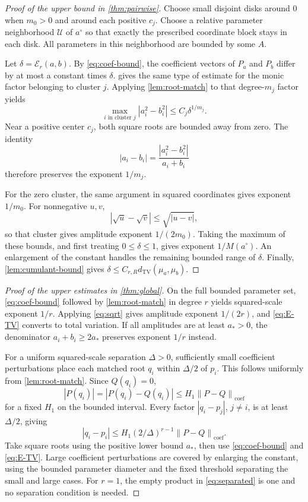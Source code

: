 \documentclass[11pt,a4paper]{article}
\numberwithin{equation}{section}
\theoremstyle{definition}
\theoremstyle{remark}
\newcommand{\TV}{d_{\mathrm{TV}}}
\newcommand{\norm}[1]{\left\lVert#1\right\rVert}
\newcommand{\coef}{\operatorname{coef}}
\newcommand{\err}{\mathcal E_r}
\newcommand{\base}{a^{\circ}}
\begin{document}
\begin{proof}[Proof of the upper bound in \cref{thm:pairwise}]
Choose small disjoint disks around $0$ when $m_0>0$ and around each positive
$c_j$.  Choose a relative parameter neighborhood $\mathcal U$ of $\base$ so that
exactly the prescribed coordinate block stays in each disk.  All parameters
in this neighborhood are bounded by some $A$.

Let $\delta=\err(a,b)$.  By \eqref{eq:coef-bound}, the coefficient vectors of
$P_a$ and $P_b$ differ by at most a constant times $\delta$.
 gives the same type of estimate for the monic factor belonging
to cluster $j$.  Applying \cref{lem:root-match} to that degree-$m_j$ factor yields
\begin{equation}
 \max_{i\text{ in cluster }j}|a_i^2-b_i^2|
 \le C_j\delta^{1/m_j}.
 \label{eq:squared-cluster}
\end{equation}
Near a positive center $c_j$, both square roots are bounded away from zero.
The identity
\[
 |a_i-b_i|=\frac{|a_i^2-b_i^2|}{a_i+b_i}
\]
therefore preserves the exponent $1/m_j$.

For the zero cluster, the same argument in squared coordinates gives exponent
$1/m_0$.  For nonnegative $u,v$,
\begin{equation}
 |\sqrt u-\sqrt v|\le\sqrt{|u-v|},
 \label{eq:sqrt}
\end{equation}
so that cluster gives amplitude exponent $1/(2m_0)$.  Taking the maximum of
these bounds, and first treating $0\le\delta\le1$, gives exponent $1/M(\base)$.
An enlargement of the constant handles the remaining bounded range of $\delta$.
Finally, \cref{lem:cumulant-bound} gives
$\delta\le C_{r,R}\TV(\mu_a,\mu_b)$.
\end{proof}

\begin{proof}[Proof of the upper estimates in \cref{thm:global}]
On the full bounded parameter set, \eqref{eq:coef-bound} followed by
\cref{lem:root-match} in degree $r$ yields squared-scale exponent $1/r$.
Applying \eqref{eq:sqrt} gives amplitude exponent $1/(2r)$, and
\eqref{eq:E-TV} converts to total variation.  If all amplitudes are at least
$a_*>0$, the denominator $a_i+b_i\ge2a_*$ preserves exponent $1/r$ instead.

For a uniform squared-scale separation $\Delta>0$, sufficiently small
coefficient perturbations place each matched root $q_i$ within $\Delta/2$ of
$p_i$.  This follows uniformly from \cref{lem:root-match}.  Since $Q(q_i)=0$,
\[
 |P(q_i)|=|P(q_i)-Q(q_i)|\le H_1\norm{P-Q}_{\coef}
\]
for a fixed $H_1$ on the bounded interval.  Every factor
$|q_i-p_j|$, $j\ne i$, is at least $\Delta/2$, giving
\begin{equation}
 |q_i-p_i|\le H_1(2/\Delta)^{r-1}\norm{P-Q}_{\coef}.
 \label{eq:separated}
\end{equation}
Take square roots using the positive lower bound $a_*$, then use
\eqref{eq:coef-bound} and \eqref{eq:E-TV}.  Large coefficient perturbations are
covered by enlarging the constant, using the bounded parameter diameter and the
fixed threshold separating the small and large cases.  For $r=1$, the empty
product in \eqref{eq:separated} is one and no separation condition is needed.
\end{proof}
\end{document}
